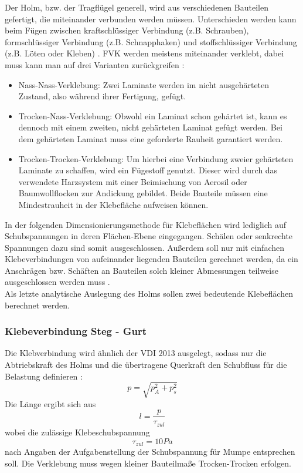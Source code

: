 Der Holm, bzw. der Tragflügel generell, wird aus verschiedenen Bauteilen gefertigt, die miteinander verbunden werden müssen. Unterschieden werden kann beim Fügen zwischen kraftschlüssiger Verbindung (z.B. Schrauben), formschlüssiger Verbindung (z.B. Schnapphaken) und stoffschlüssiger Verbindung (z.B. Löten oder Kleben) \cite{item23}. FVK werden meistens miteinander verklebt, dabei muss kann man auf drei Varianten zurückgreifen \cite{item4}:
\begin{itemize}
	\item Nass-Nass-Verklebung: Zwei Laminate werden im nicht ausgehärteten Zustand, also während ihrer Fertigung, gefügt.
	\item Trocken-Nass-Verklebung: Obwohl ein Laminat schon gehärtet ist, kann es dennoch mit einem zweiten, nicht gehärteten Laminat gefügt werden. Bei dem gehärteten Laminat muss eine geforderte Rauheit garantiert werden.
	\item Trocken-Trocken-Verklebung: Um hierbei eine Verbindung zweier gehärteten Laminate zu schaffen, wird ein Fügestoff genutzt. Dieser wird durch das verwendete Harzsystem mit einer Beimischung von Aerosil oder Baumwollflocken zur Andickung gebildet. Beide Bauteile müssen eine Mindestrauheit in der Klebefläche aufweisen können.
\end{itemize}

\noindent In der folgenden Dimensionierungsmethode für Klebeflächen wird lediglich auf Schubspannungen in deren Flächen-Ebene eingegangen. Schälen oder senkrechte Spannungen dazu sind somit ausgeschlossen. Außerdem soll nur mit einfachen Klebeverbindungen von aufeinander liegenden Bauteilen gerechnet werden, da ein Anschrägen bzw. Schäften an Bauteilen solch kleiner Abmessungen teilweise ausgeschlossen werden muss \cite{item23}.\\

\noindent Als letzte analytische Auslegung des Holms sollen zwei bedeutende Klebeflächen berechnet werden.
\subsubsection{Klebeverbindung Steg - Gurt}
Die Klebverbindung wird ähnlich der VDI 2013 ausgelegt, sodass nur die Abtriebskraft des Holms und die übertragene Querkraft den Schubfluss für die Belastung definieren \cite{item23}\cite{item5}:
\begin{equation}
	p=\sqrt{p_{A}^{2}+p_{s}^{2}}
\end{equation}
Die Länge ergibt sich aus 
\begin{equation}
	l=\frac{p}{\tau_{zul}}
\end{equation}
wobei die zulässige Klebeschubspannung
\begin{equation}
	\tau_{zul}=10 Pa
\end{equation}
nach Angaben der Aufgabenstellung der Schubspannung für Mumpe entsprechen soll. Die Verklebung muss wegen kleiner Bauteilmaße \glqq Trocken-Trocken\grqq\: erfolgen.\\

